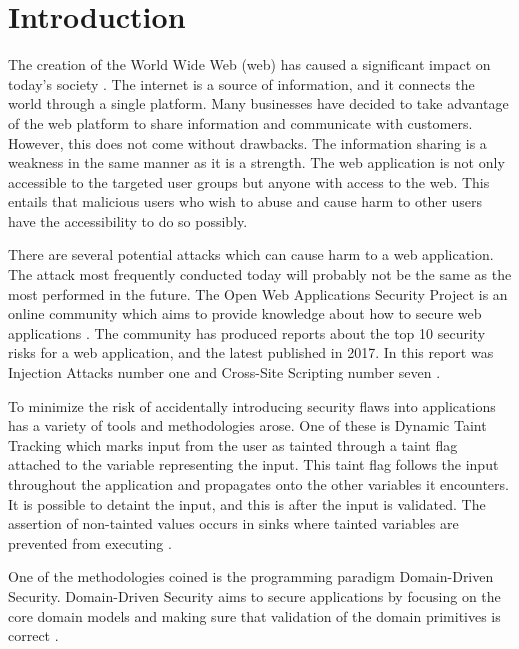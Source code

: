 \chapter{Introduction}
\label{Introduction}
The creation of the World Wide Web (web) has caused a significant impact on today's society \parencite{www}. The internet is a source of information, and it connects the world through a single platform. Many businesses have decided to take advantage of the web platform to share information and communicate with customers. However, this does not come without drawbacks. The information sharing is a weakness in the same manner as it is a strength. The web application is not only accessible to the targeted user groups but anyone with access to the web. This entails that malicious users who wish to abuse and cause harm to other users have the accessibility to do so possibly.

There are several potential attacks which can cause harm to a web application. The attack most frequently conducted today will probably not be the same as the most performed in the future. The Open Web Applications Security Project is an online community which aims to provide knowledge about how to secure web applications \parencite{OpenWebApplicationSecurityProject}. The community has produced reports about the top 10 security risks for a web application, and the latest published in 2017. In this report was Injection Attacks number one and Cross-Site Scripting number seven \parencite{OWASP2017, OpenWebApplicationSecurityProject, CrossMichael2007Dgtw}.

To minimize the risk of accidentally introducing security flaws into applications has a variety of tools and methodologies arose. One of these is Dynamic Taint Tracking which marks input from the user as tainted through a taint flag attached to the variable representing the input. This taint flag follows the input throughout the application and propagates onto the other variables it encounters. It is possible to detaint the input, and this is after the input is validated. The assertion of non-tainted values occurs in sinks where tainted variables are prevented from executing \parencite{Pan2015, Venkataramani2008}. 

One of the methodologies coined is the programming paradigm Domain-Driven Security. Domain-Driven Security aims to secure applications by focusing on the core domain models and making sure that validation of the domain primitives is correct \parencite{Wilander2009, Johnsson2009}.

